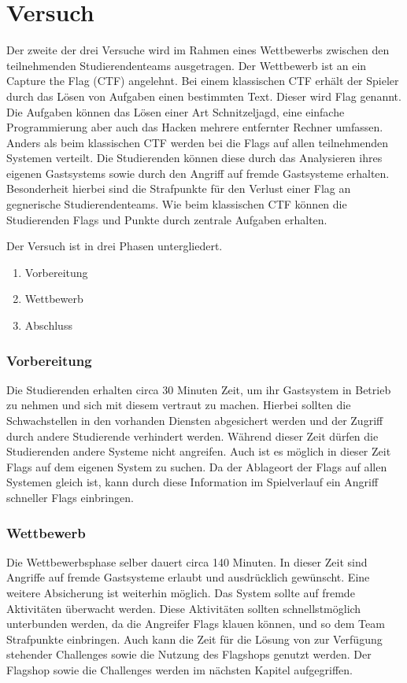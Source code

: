 \section{Versuch }
\label{sec:Versuch}

Der zweite der drei Versuche  wird im Rahmen eines Wettbewerbs zwischen den teilnehmenden Studierendenteams ausgetragen. Der Wettbewerb ist an ein Capture the Flag (CTF) angelehnt. Bei einem klassischen CTF erhält der Spieler durch das Lösen von Aufgaben einen bestimmten Text. Dieser wird Flag genannt. Die Aufgaben können das Lösen einer Art Schnitzeljagd, eine einfache Programmierung aber auch das Hacken mehrere entfernter Rechner umfassen. Anders als beim klassischen CTF werden bei  die Flags auf allen teilnehmenden Systemen verteilt. \cite{tanWhatCTFHow2020}Die Studierenden können diese durch das Analysieren ihres eigenen Gastsystems sowie durch den Angriff auf fremde Gastsysteme erhalten. Besonderheit hierbei sind die Strafpunkte für den Verlust einer Flag an gegnerische Studierendenteams. Wie beim klassischen CTF können die Studierenden Flags und Punkte durch zentrale Aufgaben erhalten.

Der Versuch ist in drei Phasen untergliedert.
\begin{enumerate}
	\item Vorbereitung
	\item Wettbewerb
	\item Abschluss
\end{enumerate}

\subsubsection{Vorbereitung}
Die Studierenden erhalten circa 30 Minuten Zeit, um ihr Gastsystem in Betrieb zu nehmen und sich mit diesem vertraut zu machen. Hierbei sollten die Schwachstellen in den vorhanden Diensten abgesichert werden und der Zugriff durch andere Studierende verhindert werden. Während dieser Zeit dürfen die Studierenden andere Systeme nicht angreifen. Auch ist es möglich in dieser Zeit Flags auf dem eigenen System zu suchen. Da der Ablageort der Flags auf allen Systemen gleich ist, kann durch diese Information im Spielverlauf ein Angriff schneller Flags einbringen.

\subsubsection{Wettbewerb}
Die Wettbewerbsphase selber dauert circa 140 Minuten. In dieser Zeit sind Angriffe auf fremde Gastsysteme erlaubt und ausdrücklich gewünscht. Eine weitere Absicherung ist weiterhin möglich. Das System sollte auf fremde Aktivitäten überwacht werden. Diese Aktivitäten sollten schnellstmöglich unterbunden werden, da die Angreifer Flags klauen können, und so dem Team Strafpunkte einbringen. Auch kann die Zeit für die Lösung von zur Verfügung stehender Challenges sowie die Nutzung des Flagshops genutzt werden. Der Flagshop sowie die Challenges werden im nächsten Kapitel aufgegriffen.

